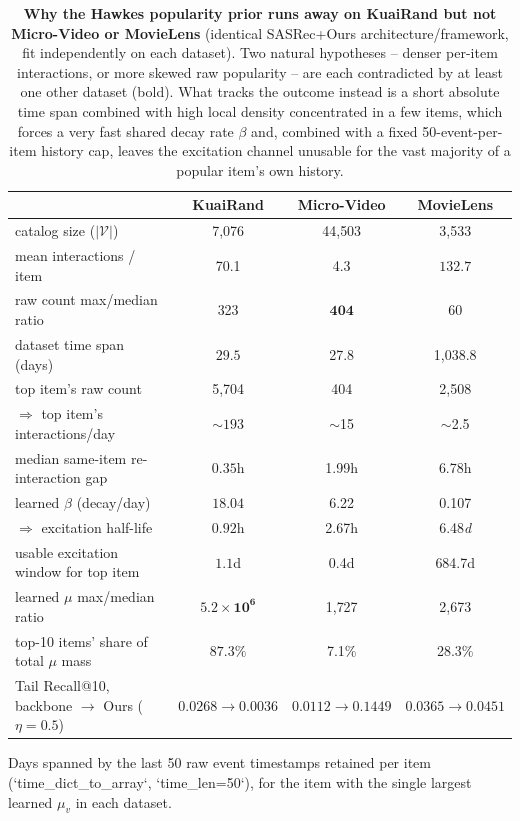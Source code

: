 \begin{table}[t]
\centering
\caption{\textbf{Why the Hawkes popularity prior runs away on KuaiRand but not
Micro-Video or MovieLens} (identical SASRec+Ours architecture/framework, fit
independently on each dataset). Two natural hypotheses -- denser per-item interactions,
or more skewed raw popularity -- are each contradicted by at least one other dataset
(bold). What tracks the outcome instead is a short absolute time span combined with high
local density concentrated in a few items, which forces a very fast shared decay rate
$\beta$ and, combined with a fixed 50-event-per-item history cap, leaves the excitation
channel unusable for the vast majority of a popular item's own history.}
\label{tab:kuairand_dataset_comparison}
\begin{tabular}{l ccc}
\toprule
 & KuaiRand & Micro-Video & MovieLens \\
\midrule
catalog size ($|\mathcal{V}|$) & 7{,}076 & 44{,}503 & 3{,}533 \\
mean interactions / item & 70.1 & 4.3 & $\mathbf{132.7}$ \\
raw count max/median ratio & 323 & $\mathbf{404}$ & 60 \\
\midrule
dataset time span (days) & $\mathbf{29.5}$ & 27.8 & 1{,}038.8 \\
top item's raw count & 5{,}704 & 404 & 2{,}508 \\
$\Rightarrow$ top item's interactions/day & $\mathbf{\sim}193$ & $\sim$15 & $\sim$2.5 \\
median same-item re-interaction gap & $\mathbf{0.35}$h & 1.99h & 6.78h \\
learned $\beta$ (decay/day) & $\mathbf{18.04}$ & 6.22 & 0.107 \\
$\Rightarrow$ excitation half-life & $\mathbf{0.92}$h & 2.67h & 6.48\emph{d} \\
usable excitation window for top item\tnote{*} & $\mathbf{1.1}$d & 0.4d & 684.7d \\
\midrule
learned $\mu$ max/median ratio & $\mathbf{5.2\times10^6}$ & 1{,}727 & 2{,}673 \\
top-10 items' share of total $\mu$ mass & $\mathbf{87.3\%}$ & 7.1\% & 28.3\% \\
Tail Recall@10, backbone $\to$ Ours ($\eta{=}0.5$) & $\mathbf{0.0268\to0.0036}$ & $0.0112\to0.1449$ & $0.0365\to0.0451$ \\
\bottomrule
\end{tabular}
\begin{tablenotes}
\item[*] Days spanned by the last 50 raw event timestamps retained per item
(`time\_dict\_to\_array`, `time\_len=50`), for the item with the single largest learned
$\mu_v$ in each dataset.
\end{tablenotes}
\end{table}
